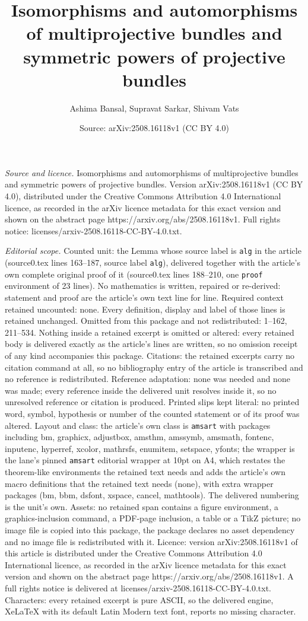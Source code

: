 \documentclass[10pt,a4paper]{amsart}
\title[Isomorphisms and automorphisms of multiprojective bundles an]{Isomorphisms and automorphisms of multiprojective bundles and symmetric powers of projective bundles}
\author{Ashima Bansal, Supravat Sarkar, Shivam Vats}
\date{Source: arXiv:2508.16118v1 (CC BY 4.0)}
\begin{document}
\maketitle

\noindent\emph{Source and licence.} Isomorphisms and automorphisms of multiprojective bundles and symmetric powers of projective bundles. Version arXiv:2508.16118v1 (CC BY 4.0), distributed under the Creative Commons Attribution 4.0 International licence, as recorded in the arXiv licence metadata for this exact version and shown on the abstract page https://arxiv.org/abs/2508.16118v1. Full rights notice: licenses/arxiv-2508.16118-CC-BY-4.0.txt.\par\smallskip

\noindent\textit{Editorial scope.} Counted unit: the Lemma whose source label is \texttt{alg} in the article (source0.tex lines 163--187, source label \texttt{alg}), delivered together with the article's own complete original proof of it (source0.tex lines 188--210, one \texttt{proof} environment of 23 lines). No mathematics is written, repaired or re-derived: statement and proof are the article's own text line for line. Required context retained uncounted: none. Every definition, display and label of those lines is retained unchanged. Omitted from this package and not redistributed: 1--162, 211--534. Nothing inside a retained excerpt is omitted or altered: every retained body is delivered exactly as the article's lines are written, so no omission receipt of any kind accompanies this package. Citations: the retained excerpts carry no citation command at all, so no bibliography entry of the article is transcribed and no reference is redistributed. Reference adaptation: none was needed and none was made; every reference inside the delivered unit resolves inside it, so no unresolved reference or citation is produced. Printed slips kept literal: no printed word, symbol, hypothesis or number of the counted statement or of its proof was altered. Layout and class: the article's own class is \texttt{amsart} with packages including bm, graphicx, adjustbox, amsthm, amssymb, amsmath, fontenc, inputenc, hyperref, xcolor, mathrsfs, enumitem, setspace, yfonts; the wrapper is the lane's pinned \texttt{amsart} editorial wrapper at 10pt on A4, which restates the theorem-like environments the retained text needs and adds the article's own macro definitions that the retained text needs (none), with extra wrapper packages (bm, bbm, dsfont, xspace, cancel, mathtools). The delivered numbering is the unit's own. Assets: no retained span contains a figure environment, a graphics-inclusion command, a PDF-page inclusion, a table or a TikZ picture; no image file is copied into this package, the package declares no asset dependency and no image file is redistributed with it. Licence: version arXiv:2508.16118v1 of this article is distributed under the Creative Commons Attribution 4.0 International licence, as recorded in the arXiv licence metadata for this exact version and shown on the abstract page https://arxiv.org/abs/2508.16118v1. A full rights notice is delivered at licenses/arxiv-2508.16118-CC-BY-4.0.txt. Characters: every retained excerpt is pure ASCII, so the delivered engine, XeLaTeX with its default Latin Modern text font, reports no missing character.
\end{document}
